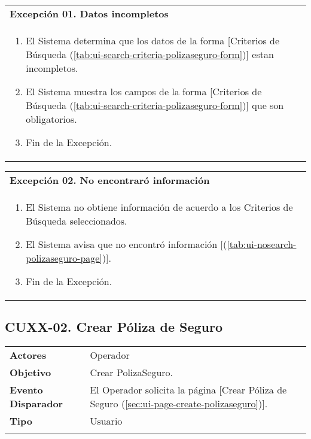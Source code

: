 \begin{tabular}{ p{15.5cm} }
	\textbf{Excepción 01. Datos incompletos} \\
	\begin{enumerate}
		\item El Sistema determina que los datos de la forma [Criterios de Búsqueda (\ref{tab:ui-search-criteria-polizaseguro-form})] estan incompletos.
		\item El Sistema muestra los campos de la forma [Criterios de Búsqueda (\ref{tab:ui-search-criteria-polizaseguro-form})] que son obligatorios.
		\item Fin de la Excepción.
	\end{enumerate}
\end{tabular}

\begin{tabular}{ p{15.5cm} }
	\textbf{Excepción 02. No encontraró información} \\
	\begin{enumerate}
		\item El Sistema no obtiene información de acuerdo a los Criterios de Búsqueda seleccionados.
		\item El Sistema avisa que no encontró información [(\ref{tab:ui-nosearch-polizaseguro-page})].
		\item Fin de la Excepción.
	\end{enumerate}
\end{tabular}


\clearpage
\subsection{CUXX-02. Crear Póliza de Seguro} \label{sec:cu-create-PolizaSeguro}

\begin{tabular}{ p{3.5cm} p{11.5cm} }
	\textbf{Actores} & Operador\\
	\textbf{Objetivo} & Crear PolizaSeguro.\\
	\textbf{Evento Disparador} & El Operador solicita la página [Crear Póliza de Seguro (\ref{sec:ui-page-create-polizaseguro})].\\
	\textbf{Tipo} & Usuario\\
	\\
\end{tabular}

